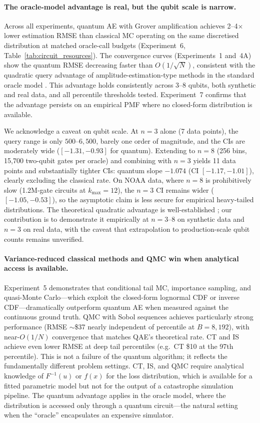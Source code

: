 \documentclass[11pt,a4paper]{article}
\begin{document}
\paragraph{The oracle-model advantage is real, but the qubit scale is narrow.} Across all experiments, quantum AE with Grover amplification achieves 2--4$\times$ lower estimation RMSE than classical MC operating on the same discretised distribution at matched oracle-call budgets (Experiment~6, Table~\ref{tab:circuit_resources}). The convergence curves (Experiments~1 and~4A) show the quantum RMSE decreasing faster than $O(1/\sqrt{N})$, consistent with the quadratic query advantage of amplitude-estimation-type methods in the standard oracle model \cite{Brassard2002}. This advantage holds consistently across 3--8 qubits, both synthetic and real data, and all percentile thresholds tested. Experiment~7 confirms that the advantage persists on an empirical PMF where no closed-form distribution is available.

We acknowledge a caveat on qubit scale. At $n=3$ alone (7 data points), the query range is only $500$--$6{,}500$, barely one order of magnitude, and the CIs are moderately wide ($[-1.31, -0.93]$ for quantum). Extending to $n=8$ (256 bins, 15,700 two-qubit gates per oracle) and combining with $n=3$ yields 11 data points and substantially tighter CIs: quantum slope $-1.074$ (CI $[-1.17, -1.01]$), clearly excluding the classical rate. On NOAA data, where $n=8$ is prohibitively slow (1.2M-gate circuits at $k_{\max}=12$), the $n=3$ CI remains wider ($[-1.05, -0.53]$), so the asymptotic claim is less secure for empirical heavy-tailed distributions. The theoretical quadratic advantage is well-established \cite{Brassard2002, Montanaro2015}; our contribution is to demonstrate it empirically at $n=3$--$8$ on synthetic data and $n=3$ on real data, with the caveat that extrapolation to production-scale qubit counts remains unverified.

\paragraph{Variance-reduced classical methods and QMC win when analytical access is available.} Experiment~5 demonstrates that conditional tail MC, importance sampling, and quasi-Monte Carlo---which exploit the closed-form lognormal CDF or inverse CDF---dramatically outperform quantum AE when measured against the continuous ground truth. QMC with Sobol sequences achieves particularly strong performance (RMSE $\sim$\$37 nearly independent of percentile at $B = 8{,}192$), with near-$O(1/N)$ convergence that matches QAE's theoretical rate. CT and IS achieve even lower RMSE at deep tail percentiles (e.g.\ CT \$10 at the 97th percentile). This is not a failure of the quantum algorithm; it reflects the fundamentally different problem settings. CT, IS, and QMC require analytical knowledge of $F^{-1}(u)$ or $f(x)$ for the loss distribution, which is available for a fitted parametric model but not for the output of a catastrophe simulation pipeline. The quantum advantage applies in the oracle model, where the distribution is accessed only through a quantum circuit---the natural setting when the ``oracle'' encapsulates an expensive simulator.
\end{document}
